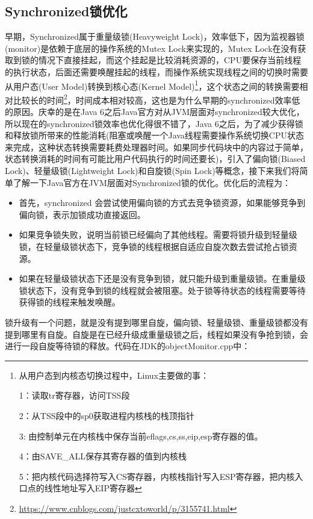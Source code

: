\documentclass[../../../interview-questions.tex]{subfiles}
\begin{document}
\subsection{Synchronized锁优化}

早期，Synchronized属于重量级锁(Heavyweight Lock)，效率低下，因为监视器锁(monitor)是依赖于底层的操作系统的Mutex Lock来实现的，Mutex Lock在没有获取到锁的情况下直接挂起，而这个挂起是比较消耗资源的，CPU要保存当前线程的执行状态，后面还需要唤醒挂起的线程，而操作系统实现线程之间的切换时需要从用户态(User Model)转换到核心态(Kernel Model)\footnote{从用户态到内核态切换过程中，Linux主要做的事：

1：读取tr寄存器，访问TSS段

2：从TSS段中的sp0获取进程内核栈的栈顶指针

3:  由控制单元在内核栈中保存当前eflags,cs,ss,eip,esp寄存器的值。

4：由SAVE\_ALL保存其寄存器的值到内核栈

5：把内核代码选择符写入CS寄存器，内核栈指针写入ESP寄存器，把内核入口点的线性地址写入EIP寄存器}，这个状态之间的转换需要相对比较长的时间\footnote{\url{https://www.cnblogs.com/justcxtoworld/p/3155741.html}}，时间成本相对较高，这也是为什么早期的synchronized效率低的原因。庆幸的是在Java 6之后Java官方对从JVM层面对synchronized较大优化，所以现在的synchronized锁效率也优化得很不错了，Java 6之后，为了减少获得锁和释放锁所带来的性能消耗(阻塞或唤醒一个Java线程需要操作系统切换CPU状态来完成，这种状态转换需要耗费处理器时间。如果同步代码块中的内容过于简单，状态转换消耗的时间有可能比用户代码执行的时间还要长)，引入了偏向锁(Biased Lock)、轻量级锁(Lightweight Lock)和自旋锁(Spin Lock)等概念，接下来我们将简单了解一下Java官方在JVM层面对Synchronized锁的优化。优化后的流程为：

\begin{itemize}
    \item {首先，synchronized 会尝试使用偏向锁的方式去竞争锁资源，如果能够竞争到偏向锁，表示加锁成功直接返回。}
    \item {如果竞争锁失败，说明当前锁已经偏向了其他线程。需要将锁升级到轻量级锁，在轻量级锁状态下，竞争锁的线程根据自适应自旋次数去尝试抢占锁资源。}
    \item {如果在轻量级锁状态下还是没有竞争到锁，就只能升级到重量级锁。在重量级锁状态下，没有竞争到锁的线程就会被阻塞。处于锁等待状态的线程需要等待获得锁的线程来触发唤醒。}
\end{itemize}

锁升级有一个问题，就是没有提到哪里自旋，偏向锁、轻量级锁、重量级锁都没有提到哪里有自旋。自旋是在已经升级成重量级锁之后，线程如果没有争抢到锁，会进行一段自旋等待锁的释放。代码在JDK的objectMonitor.cpp中：
\end{document}
